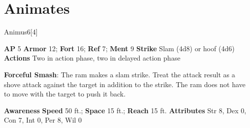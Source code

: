 \section{Animates}
\begin{monsection}[Ram]{Animus}{6}[4]
\vspace{-1em}\vspace{-1em}
\begin{spellcontent}
\begin{spelltargetinginfo}
{\textbf{AP} 5}
\pari \textbf{Armor} 12;
\textbf{Fort} 16;
\textbf{Ref} 7;
\textbf{Ment} 9
\pari \textbf{Strike} Slam  (4d8) or hoof  (4d6)
\pari \textbf{Actions} Two in action phase, two in delayed action phase
\end{spelltargetinginfo}
\begin{spelleffects}
\pari
\textbf{Forceful Smash}:
The ram makes a slam strike.
Treat the attack result as a shove attack against the target in addition to the strike.
The ram does not have to move with the target to push it back.
\end{spelleffects}
\end{spellcontent}
\begin{spellsubcontent}
\begin{spellfooter}
\pari \textbf{Awareness} 
\pari \textbf{Speed} 50 ft.;
\textbf{Space} 15 ft.;
\textbf{Reach} 15 ft.
\pari \textbf{Attributes}
Str 8,
Dex 0,
Con 7,
Int 0,
Per 8,
Wil 0
\end{spellfooter}
\end{spellsubcontent}
\end{monsection}
